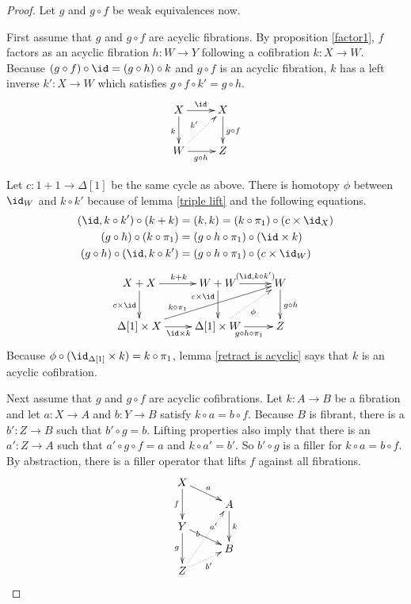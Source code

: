 \documentclass{tac}
\newcommand\of{:}
\newcommand\simplex\Delta
\begin{document}
\begin{proof}
Let $g$ and $g\circ f$ be weak equivalences now.

First assume that $g$ and $g\circ f$ are acyclic fibrations. By proposition \ref{factor1}, $f$ factors as an acyclic fibration $h\of W\to Y$ following a cofibration $k\of X\to W$. Because $(g\circ f)\circ \id = (g\circ h)\circ k$ and $g\circ f$ is an acyclic fibration, $k$ has a left inverse $k'\of X\to W$ which satisfies $g\circ f\circ k' = g\circ h$. 
\[\xymatrix{
X\ar[d]_k \ar[r]^\id & X\ar[d]^{g\circ f}\\
W\ar[r]_{g\circ h} \ar@{.>}[ur]^{k'} & Z
}\]

Let $c\of 1+1\to\simplex[1]$ be the same cycle as above. There is homotopy $\phi$ between $\id_W$ and $k\circ k'$ because of lemma \ref{triple lift} and the following equations.
\begin{align*}
(\id,k\circ k')\circ(k+k) &= (k,k) = (k\circ\pi_1)\circ (c\times\id_X)\\
(g\circ h)\circ (k\circ \pi_1) &= (g\circ h\circ \pi_1)\circ(\id\times k)\\
(g\circ h)\circ (\id,k\circ k') &= (g\circ h\circ \pi_1)\circ(c\times\id_W)
\end{align*}
\[\xymatrix{
X+X \ar[d]_{c\times \id}\ar[r]^{k+k} & W+W\ar[d]_(.3){c\times\id}\ar[r]^(.6){(\id,k\circ k')} & W\ar[d]^{g\circ h}\\
\simplex[1]\times X \ar[r]_{\id\times k}\ar[urr]^(.3){k\circ\pi_1}& \simplex[1]\times W\ar[r]_{g\circ h\circ \pi_1}\ar@{.>}[ur]_\phi & Z
}\]
Because $\phi\circ (\id_{\simplex[1]}\times k)=k\circ \pi_1$, lemma \ref{retract is acyclic} says that $k$ is an acyclic cofibration.

Next assume that $g$ and $g\circ f$ are acyclic cofibrations. Let $k\of A\to B$ be a fibration and let $a\of X\to A$ and $b\of Y\to B$ satisfy $k\circ a=b\circ f$. Because $B$ is fibrant, there is a $b'\of Z\to B$ such that $b'\circ g = b$. Lifting properties also imply that there is an $a'\of Z\to A$ such that $a'\circ g\circ f = a$ and $k\circ a'= b'$. So $b'\circ g$ is a filler for $k\circ a=b\circ f$. By abstraction, there is a filler operator that lifts $f$ against all fibrations.
\[\xy
(0,28)*+{X}="x",(14\halfrootthree,21)*+{A}="a",(0,14)*+{Y}="y",(14\halfrootthree,7)*+{B}="b",(0,0)*+{Z}="z"
\ar^a "x";"a" \ar_f "x";"y" \ar^k "a";"b" \ar|(.33)b "y";"b" \ar_g "y";"z"
\ar@{.>}_{b'} "z";"b" \ar@{.>}|(.67){a'} "z";"a"
\endxy\]


\end{proof}
\end{document}
